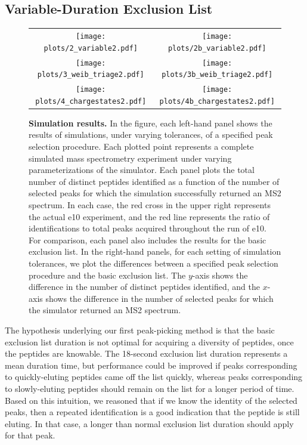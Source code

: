\documentclass[12pt]{article}
\begin{document}
\subsection*{Variable-Duration Exclusion List}

\begin{figure}
\centering
\begin{tabular}{cc}
\texttt{[image: plots/2\_variable2.pdf]} &
\texttt{[image: plots/2b\_variable2.pdf]} \\
\texttt{[image: plots/3\_weib\_triage2.pdf]} &
\texttt{[image: plots/3b\_weib\_triage2.pdf]} \\
\texttt{[image: plots/4\_chargestates2.pdf]} &
\texttt{[image: plots/4b\_chargestates2.pdf]} \\
\end{tabular}
\caption{{\bf Simulation results.}  In the figure, each left-hand panel shows the results of simulations, under
  varying tolerances, of a specified peak selection
  procedure. 
 Each plotted point represents a
  complete simulated mass spectrometry experiment under varying
  parameterizations of the simulator. Each panel plots the total number of
  distinct peptides identified as a function of the number of selected peaks for which the simulation successfully returned an MS2 spectrum. In each case, the red cross in the upper right represents the actual e10
  experiment, and the red line represents the ratio of identifications to total peaks
  acquired throughout the run of e10.
For comparison, each panel also includes the results for
  the basic exclusion list.  In the right-hand panels, for each
  setting of simulation tolerances, we plot the differences
  between a specified peak selection procedure and the basic exclusion
  list. The $y$-axis shows the difference in the number of distinct
  peptides identified, and the $x$-axis shows the difference in the
  number of selected peaks for which the simulator returned an MS2
  spectrum. 
  \label{figure:simulation}}
\end{figure}

The hypothesis underlying our first peak-picking method is that the
basic exclusion list duration is not optimal for acquiring a diversity of
peptides, once the peptides are knowable. The 18-second exclusion list duration
represents a mean duration time, but performance could be improved if peaks corresponding to quickly-eluting peptides
came off the list quickly, whereas peaks corresponding to slowly-eluting peptides should remain on the list for a longer period of time. Based on this intuition, we reasoned that if we know the identity of the
selected peaks, then a repeated identification is a good indication that the peptide
is still eluting. In that case, a longer than normal exclusion list duration
should apply for that peak.
\end{document}
